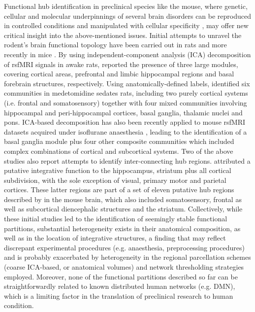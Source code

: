Functional hub identification in preclinical species like the mouse, where
genetic, cellular and molecular underpinnings of several brain disorders can be
reproduced in controlled conditions and manipulated with cellular specificity
\parencite{deisseroth2011}, may offer new critical insight into the
above-mentioned issues. Initial attempts to unravel the rodent’s brain
functional topology have been carried out in rats \parencite{dsouza2014,
liang2011, liang2012} and more recently in mice \parencite{mechling2014,
stafford2014}. By using independent-component analysis (ICA) decomposition of
rsfMRI signals in awake rats, \textcite{liang2011} reported the
presence of three large modules, covering cortical areas, prefrontal and limbic
hippocampal regions and basal forebrain structures, respectively. Using
anatomically-defined labels, \textcite{dsouza2014} identified six
communities in medetomidine sedates rats, including two purely cortical systems
(i.e. frontal and somatosensory) together with four mixed communities involving
hippocampal and peri-hippocampal cortices, basal ganglia, thalamic nuclei and
pons. ICA-based decomposition has also been recently applied to mouse rsfMRI
datasets acquired under isoflurane anaesthesia \parencite{mechling2014}, leading
to the identification of a basal ganglia module plus four other composite
communities which included complex combinations of cortical and subcortical
systems. Two of the above studies also report attempts to identify
inter-connecting hub regions. \textcite{dsouza2014} attributed a putative
integrative function to the hippocampus, striatum plus all cortical subdivision,
with the sole exception of visual, primary motor and parietal cortices. These
latter regions are part of a set of eleven putative hub regions described by
\textcite{mechling2014} in the mouse brain, which also included somatosensory,
frontal as well as subcortical diencephalic structures and the striatum.
Collectively, while these initial studies led to the identification of seemingly
stable functional partitions, substantial heterogeneity exists in their
anatomical composition, as well as in the location of integrative structures, a
finding that may reflect discrepant experimental procedures (e.g. anaesthesia,
preprocessing procedures) and is probably exacerbated by heterogeneity in the
regional parcellation schemes (coarse ICA-based, or anatomical volumes) and
network thresholding strategies employed. Moreover, none of the functional
partitions described so far can be straightforwardly related to known
distributed human networks (e.g.  DMN), which is a limiting factor in the
translation of preclinical research to human condition. 

